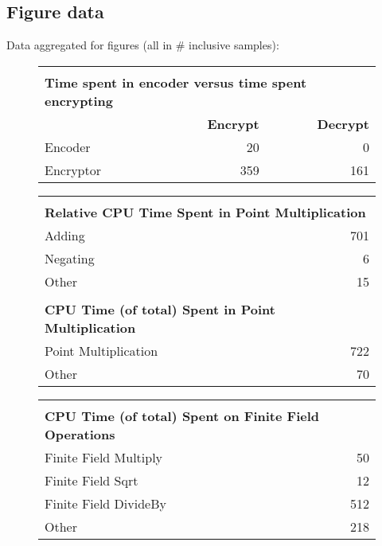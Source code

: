 \subsection{Figure data}

Data aggregated for figures (all in \# inclusive samples):

\begin{figure}[h!]
\begin{tabular}{|l|r|r|}
	\hline
    \multicolumn{3}{|l|}{} \\
	\multicolumn{3}{|l|}{\textbf{Time spent in encoder versus time spent encrypting}} \\
    \hline
	& \textbf{Encrypt} & \textbf{Decrypt} \\
	Encoder & 20 & 0 \\
	Encryptor & 359 & 161 \\
	\hline
\end{tabular}
\end{figure}

\begin{figure}[h!]
\begin{tabular}{|l|r|}
	\hline
    \multicolumn{2}{|l|}{} \\
	\multicolumn{2}{|l|}{\textbf{Relative CPU Time Spent in Point Multiplication}} \\
    \hline
	Adding & 701 \\
	Negating & 6 \\
	Other & 15 \\
	\hline
    \multicolumn{2}{|l|}{} \\
	\multicolumn{2}{|l|}{\textbf{CPU Time (of total) Spent in Point Multiplication}} \\
    \hline
	Point Multiplication & 722 \\
	Other & 70 \\
	\hline
\end{tabular}
\end{figure}

\begin{figure}[h!]
\begin{tabular}{|l|r|}
	\hline
    \multicolumn{2}{|l|}{} \\
	\multicolumn{2}{|l|}{\textbf{CPU Time (of total) Spent on Finite Field Operations}} \\
    \hline
	Finite Field Multiply & 50 \\
	Finite Field Sqrt & 12 \\
	Finite Field DivideBy & 512 \\
	Other & 218 \\
	\hline
\end{tabular}
\end{figure}

